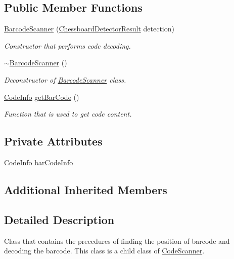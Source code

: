 \subsection*{Public Member Functions}
\begin{DoxyCompactItemize}
\item 
\hyperlink{class_barcode_scanner_a75a2c1664c6fae1af960db85e4a118c1}{Barcode\+Scanner} (\hyperlink{struct_chessboard_detector_result}{Chessboard\+Detector\+Result} detection)
\begin{DoxyCompactList}\small\item\em Constructor that performs code decoding. \end{DoxyCompactList}\item 
\hyperlink{class_barcode_scanner_a8a9f32500c2e83547fd5cdce8450634a}{$\sim$\+Barcode\+Scanner} ()
\begin{DoxyCompactList}\small\item\em Deconstructor of \hyperlink{class_barcode_scanner}{Barcode\+Scanner} class. \end{DoxyCompactList}\item 
\hyperlink{struct_code_info}{Code\+Info} \hyperlink{class_barcode_scanner_a33b8ce809789f70f0c5b63447175d218}{get\+Bar\+Code} ()
\begin{DoxyCompactList}\small\item\em Function that is used to get code content. \end{DoxyCompactList}\end{DoxyCompactItemize}
\subsection*{Private Attributes}
\begin{DoxyCompactItemize}
\item 
\hyperlink{struct_code_info}{Code\+Info} \hyperlink{class_barcode_scanner_a843ee092e719a72ed88002e89d9e9992}{bar\+Code\+Info}
\end{DoxyCompactItemize}
\subsection*{Additional Inherited Members}


\subsection{Detailed Description}
Class that contains the precedures of finding the position of barcode and decoding the barcode. This class is a child class of \hyperlink{class_code_scanner}{Code\+Scanner}. 

